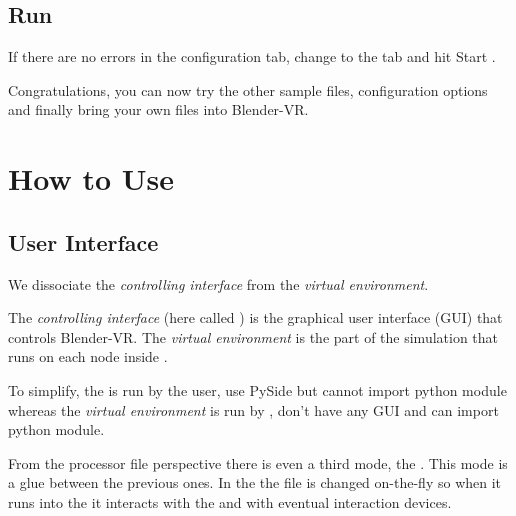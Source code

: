 \documentclass[a4,10pt,openany,oneside]{sphinxmanual}
\begin{document}
\section{Run}
\label{first-run:run}
If there are no errors in the configuration tab, change to the  tab and hit Start .

Congratulations, you can now try the other sample files, configuration options and finally bring your own  files into Blender-VR.


\chapter{How to Use}
\label{components/index:how-to-use}\label{components/index::doc}

\section{User Interface}
\label{components/user-interface:user-interface}\label{components/user-interface::doc}
We dissociate the \emph{controlling interface} from the \emph{virtual environment}.

The \emph{controlling interface} (here called ) is the graphical user interface (GUI) that controls Blender-VR. The \emph{virtual environment} is the part of the simulation that runs on each node inside .

To simplify, the  is run by the user, use PySide but cannot import  python module whereas the \emph{virtual environment} is run by , don't have any GUI and can import  python module.

From the processor file perspective there is even a third mode, the . This mode is a glue between the previous ones. In the  the  file is changed on-the-fly so when it runs into the  it interacts with the  and with eventual interaction devices.
\end{document}
